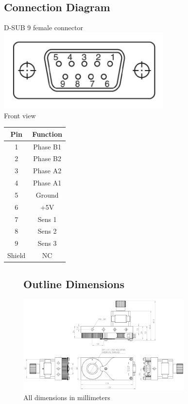\documentclass[a4paper, final, 12pt, oneside]{scrartcl}
\numberwithin{equation}{section}
\numberwithin{table}{section}
\numberwithin{figure}{section}
\begin{document}
\subsection*{Connection Diagram}
 \begin{minipage}{\textwidth}
  \begin{minipage}[b]{0.49\textwidth}
    \centering
    D-SUB 9 female connector\\
    \includegraphics[width=0.65\textwidth]{./drawings/dsub9fem.jpg}\\
    Front view
  \end{minipage}
  \hfill
  \begin{minipage}[b]{0.49\textwidth}
    \begin{tabular}{cc}
      \toprule
      \textbf{Pin} & \textbf{Function} \\
      \toprule
      1 & Phase B1 \\ \midrule
      2 & Phase B2\\ \midrule
      3 & Phase A2 \\ \midrule
      4 & Phase A1 \\ \midrule
      5 & Ground \\ \midrule
      6 & +5V \\ \midrule
      7 & Sens 1 \\ \midrule
      8 & Sens 2 \\ \midrule
      9 & Sens 3 \\ \midrule
      Shield & NC \\
      \bottomrule
    \end{tabular}
  \end{minipage}
\end{minipage}



\FloatBarrier
\begin{figure}
\subsection*{Outline Dimensions}
  \centering
  \includegraphics[angle=90,origin=c,width=0.78\textwidth]{./drawings/M101_outline_dimensions.pdf}
  \caption*{All dimensions in millimeters}
\end{figure}
\vfill
\FloatBarrier
\end{document}
